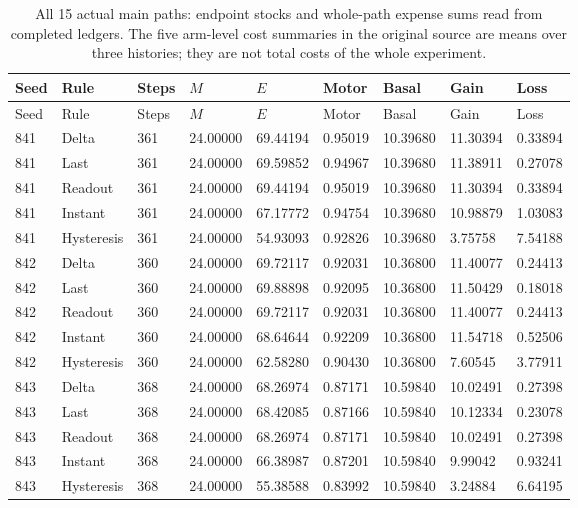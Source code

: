 \begin{longtable}{lllllllll}
\caption{All 15 actual main paths: endpoint stocks and whole-path expense sums read from completed ledgers. The five arm-level cost summaries in the original source are means over three histories; they are not total costs of the whole experiment.}\label{tab:physical-state-costs}\\
\toprule
Seed & Rule & Steps & $M$ & $E$ & Motor & Basal & Gain & Loss \\
\midrule
\endfirsthead
\toprule
Seed & Rule & Steps & $M$ & $E$ & Motor & Basal & Gain & Loss \\
\midrule
\endhead
841 & Delta & 361 & 24.00000 & 69.44194 & 0.95019 & 10.39680 & 11.30394 & 0.33894 \\
841 & Last & 361 & 24.00000 & 69.59852 & 0.94967 & 10.39680 & 11.38911 & 0.27078 \\
841 & Readout & 361 & 24.00000 & 69.44194 & 0.95019 & 10.39680 & 11.30394 & 0.33894 \\
841 & Instant & 361 & 24.00000 & 67.17772 & 0.94754 & 10.39680 & 10.98879 & 1.03083 \\
841 & Hysteresis & 361 & 24.00000 & 54.93093 & 0.92826 & 10.39680 & 3.75758 & 7.54188 \\
842 & Delta & 360 & 24.00000 & 69.72117 & 0.92031 & 10.36800 & 11.40077 & 0.24413 \\
842 & Last & 360 & 24.00000 & 69.88898 & 0.92095 & 10.36800 & 11.50429 & 0.18018 \\
842 & Readout & 360 & 24.00000 & 69.72117 & 0.92031 & 10.36800 & 11.40077 & 0.24413 \\
842 & Instant & 360 & 24.00000 & 68.64644 & 0.92209 & 10.36800 & 11.54718 & 0.52506 \\
842 & Hysteresis & 360 & 24.00000 & 62.58280 & 0.90430 & 10.36800 & 7.60545 & 3.77911 \\
843 & Delta & 368 & 24.00000 & 68.26974 & 0.87171 & 10.59840 & 10.02491 & 0.27398 \\
843 & Last & 368 & 24.00000 & 68.42085 & 0.87166 & 10.59840 & 10.12334 & 0.23078 \\
843 & Readout & 368 & 24.00000 & 68.26974 & 0.87171 & 10.59840 & 10.02491 & 0.27398 \\
843 & Instant & 368 & 24.00000 & 66.38987 & 0.87201 & 10.59840 & 9.99042 & 0.93241 \\
843 & Hysteresis & 368 & 24.00000 & 55.38588 & 0.83992 & 10.59840 & 3.24884 & 6.64195 \\
\bottomrule
\end{longtable}
